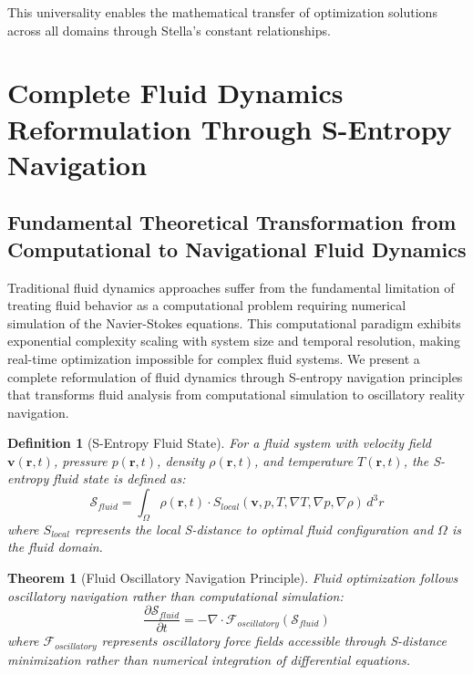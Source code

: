 \documentclass[12pt,a4paper]{article}
\newtheorem{theorem}{Theorem}
\newtheorem{definition}{Definition}
\begin{document}
This universality enables the mathematical transfer of optimization solutions across all domains through Stella's constant relationships.

\section{Complete Fluid Dynamics Reformulation Through S-Entropy Navigation}

\subsection{Fundamental Theoretical Transformation from Computational to Navigational Fluid Dynamics}

Traditional fluid dynamics approaches suffer from the fundamental limitation of treating fluid behavior as a computational problem requiring numerical simulation of the Navier-Stokes equations. This computational paradigm exhibits exponential complexity scaling with system size and temporal resolution, making real-time optimization impossible for complex fluid systems. We present a complete reformulation of fluid dynamics through S-entropy navigation principles that transforms fluid analysis from computational simulation to oscillatory reality navigation.

\begin{definition}[S-Entropy Fluid State]
For a fluid system with velocity field $\mathbf{v}(\mathbf{r}, t)$, pressure $p(\mathbf{r}, t)$, density $\rho(\mathbf{r}, t)$, and temperature $T(\mathbf{r}, t)$, the S-entropy fluid state is defined as:
\begin{equation}
\mathcal{S}_{fluid} = \int_{\Omega} \rho(\mathbf{r}, t) \cdot S_{local}(\mathbf{v}, p, T, \nabla T, \nabla p, \nabla \rho) \, d^3r
\end{equation}
where $S_{local}$ represents the local S-distance to optimal fluid configuration and $\Omega$ is the fluid domain.
\end{definition}

\begin{theorem}[Fluid Oscillatory Navigation Principle]
Fluid optimization follows oscillatory navigation rather than computational simulation:
\begin{equation}
\frac{\partial \mathcal{S}_{fluid}}{\partial t} = -\nabla \cdot \mathcal{F}_{oscillatory}(\mathcal{S}_{fluid})
\end{equation}
where $\mathcal{F}_{oscillatory}$ represents oscillatory force fields accessible through S-distance minimization rather than numerical integration of differential equations.
\end{theorem}
\end{document}

